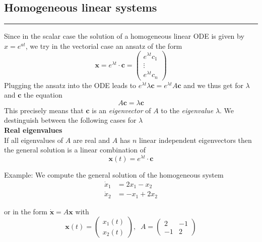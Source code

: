 \subsection{Homogeneous linear systems}
\noindent\rule[\linienAbstand]{\linewidth}{\linienDicke}
Since in the scalar case the solution of a homogeneous linear ODE is given by $x = e^{at}$, we try in the vectorial case an ansatz of the form
\begin{equation}
  \mathbf{x} = e^{\lambda t} \cdot \mathbf{c} =
  \begin{pmatrix}
    e^{\lambda t}c_1\\
    \vdots\\
    e^{\lambda t}c_n
  \end{pmatrix}
\end{equation}
Plugging the ansatz into the ODE leads to $e^{\lambda t}\lambda \mathbf{c} = e^{\lambda t} A\mathbf{c}$ and we thus get for $\lambda$ and $\mathbf{c}$ the equation
\begin{equation}
  A\mathbf{c} = \lambda \mathbf{c}
\end{equation}
This precisely means that $\mathbf{c}$ is an \emph{eigenvector} of $A$ to the \emph{eigenvalue} $\lambda$.
We destinguish between the following cases for $\lambda$\\

\textbf{Real eigenvalues}\\
If all eigenvalues of $A$ are real and $A$ has $n$ linear independent eigenvectors then the general solution is a linear combination of
\begin{equation}
  \mathbf{x}(t) = e^{\lambda t} \cdot \mathbf{c}
\end{equation}

Example: We compute the general solution of the homogeneous system
\begin{equation}
  \begin{split}
    \dot{x}_1 &= 2x_1 - x_2\\
    \dot{x}_2 &= -x_1 + 2x_2
  \end{split}
\end{equation}

or in the form $\dot{\mathbf{x}} = A\mathbf{x}$ with
\begin{equation}
  \mathbf{x}(t) = \begin{pmatrix}
    x_1(t)\\
    x_2(t)
  \end{pmatrix}
  , \;\; A = \begin{pmatrix}
      2 & -1\\
      -1 & 2
  \end{pmatrix}
\end{equation}


